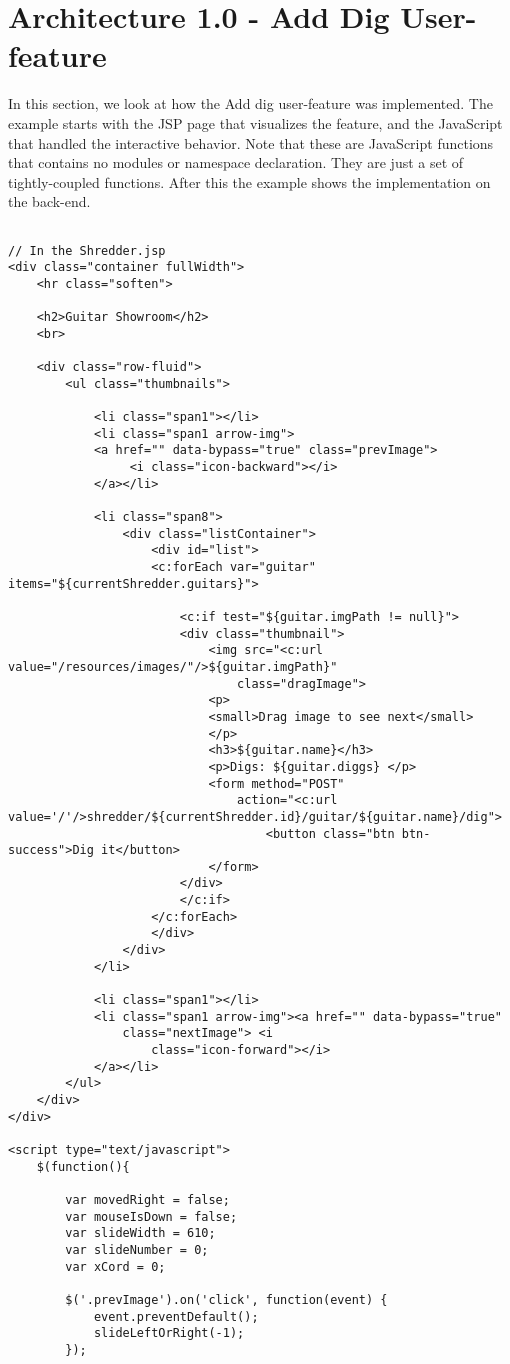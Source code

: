 \section{Architecture 1.0 - Add Dig User-feature}
In this section, we look at how the Add dig user-feature was implemented. The example starts with the JSP page that visualizes the feature, and the JavaScript that handled the interactive behavior. Note that these are JavaScript functions that contains no modules or namespace declaration. They are just a set of tightly-coupled functions. After this the example shows the implementation on the back-end.

\begin{lstlisting}

// In the Shredder.jsp
<div class="container fullWidth">
	<hr class="soften">

	<h2>Guitar Showroom</h2>
	<br>

	<div class="row-fluid">
		<ul class="thumbnails">

			<li class="span1"></li>
			<li class="span1 arrow-img">
			<a href="" data-bypass="true" class="prevImage">
				 <i class="icon-backward"></i>
			</a></li>

			<li class="span8">
				<div class="listContainer">
					<div id="list">						
					<c:forEach var="guitar" items="${currentShredder.guitars}">
						
						<c:if test="${guitar.imgPath != null}">
						<div class="thumbnail">
							<img src="<c:url value="/resources/images/"/>${guitar.imgPath}"
								class="dragImage">
							<p>
							<small>Drag image to see next</small>
							</p>
							<h3>${guitar.name}</h3>
							<p>Digs: ${guitar.diggs} </p>
							<form method="POST" 
								action="<c:url value='/'/>shredder/${currentShredder.id}/guitar/${guitar.name}/dig">
									<button class="btn btn-success">Dig it</button>
							</form>
						</div>
						</c:if>
					</c:forEach>
					</div>
				</div>
			</li>

			<li class="span1"></li>
			<li class="span1 arrow-img"><a href="" data-bypass="true"
				class="nextImage"> <i
					class="icon-forward"></i>
			</a></li>
		</ul>
	</div>
</div>
	
<script type="text/javascript">	
	$(function(){
		
		var movedRight = false;
		var mouseIsDown = false;
		var slideWidth = 610;
		var slideNumber = 0;
		var xCord = 0;
		
		$('.prevImage').on('click', function(event) {
			event.preventDefault();
			slideLeftOrRight(-1);
		}); 
		

\end{lstlisting}
